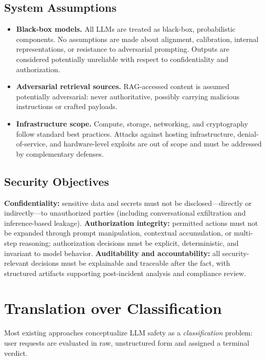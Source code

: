 \documentclass[conference]{IEEEtran}
\begin{document}
\subsection{System Assumptions}
\begin{itemize}
\item \textbf{Black-box models.} All LLMs are treated as black-box,
probabilistic components. No assumptions are made about alignment,
calibration, internal representations, or resistance to adversarial
prompting. Outputs are considered potentially unreliable with respect to
confidentiality and authorization.
\item \textbf{Adversarial retrieval sources.} RAG-accessed content is
assumed potentially adversarial: never authoritative, possibly carrying
malicious instructions or crafted payloads.
\item \textbf{Infrastructure scope.} Compute, storage, networking, and
cryptography follow standard best practices. Attacks against hosting
infrastructure, denial-of-service, and hardware-level exploits are out of
scope and must be addressed by complementary defenses.
\end{itemize}

\subsection{Security Objectives}
\textbf{Confidentiality:} sensitive data and secrets must not be
disclosed---directly or indirectly---to unauthorized parties (including
conversational exfiltration and inference-based leakage).
\textbf{Authorization integrity:} permitted actions must not be expanded
through prompt manipulation, contextual accumulation, or multi-step
reasoning; authorization decisions must be explicit, deterministic, and
invariant to model behavior. \textbf{Auditability and accountability:}
all security-relevant decisions must be explainable and traceable after
the fact, with structured artifacts supporting post-incident analysis and
compliance review.

\section{Translation over Classification}
\label{sec:translation-over}

Most existing approaches conceptualize LLM safety as a \emph{classification}
problem: user requests are evaluated in raw, unstructured form and
assigned a terminal verdict.
\end{document}

